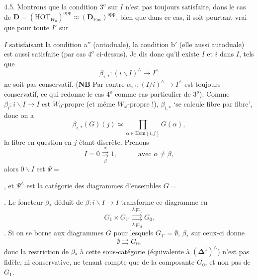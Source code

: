 \documentclass[11pt]{article}
\newcommand{\printedpage}[1]{\marginpar{\footnotesize p.~#1}}
\def\dcprintedpending{}
\newcommand{\msp}[1]{\marginpar{\footnotesize\raggedright
  \ifx\dcprintedpending\empty\else p.~\dcprintedpending\par\fi
  [#1]}\gdef\dcprintedpending{}}
\newcommand{\bD}{\mathbf{D}}
\begin{document}
4.5. Montrons que la condition $3^o$ sur $I$ n'est pas toujours satisfaite, dans le cas de $\bD = (\mathrm{HOT}_{W_0})^{\mathrm{opp}} \approx (\bD_{\mathrm{Ens}})^{\mathrm{opp}}$, bien que dans ce cas, il soit pourtant vrai que pour toute $I'$ sur

\printedpage{39}

$I$ satisfaisant la condition a$''$ (autoduale), la condition b$'$ (elle aussi autoduale) est aussi satisfaite (par cas $4^o$ ci-dessus). Je dis donc qu'il existe $I$ et $i$ dans $I$, tels que
\[
\beta_{i,*} : (i\backslash I)^\wedge \longrightarrow I^\wedge
\]
ne soit pas conservatif. (\textbf{NB} Par contre $\alpha_{i,!} : (I/i)^\wedge \longrightarrow I^\wedge$ est toujours conservatif, ce qui redonne le cas $4^o$ comme cas particulier de $3^o$). Comme $\beta_i : i\backslash I \longrightarrow I$ est $W_0$-propre (et même $W_\omega$-propre !), $\beta_{i,*}$ `se calcule fibre par fibre', donc on a
\msp{page 64}
\[
\beta_{i,*}(G)(j) \simeq \prod_{\alpha\in\mathrm{Hom}(i,j)} G(\alpha),
\]
la fibre en question en $j$ étant discrète. Prenons
\[
I = 0 \underset{\beta}{\overset{\alpha}{\rightrightarrows}} 1, \qquad\quad \text{avec } \alpha \neq \beta,
\]
alors $0\backslash I$ est $\Psi = {}$, et $\Psi^\wedge$ est la catégorie des diagrammes d'ensembles $G = {}$. Le foncteur $\beta_*$ déduit de $\beta : i\backslash I \longrightarrow I$ transforme ce diagramme en
\[
G_1 \times G_{1'} \underset{\lambda\,\mathrm{pr}_2}{\overset{\lambda\,\mathrm{pr}_1}{\rightrightarrows}} G_0.
\]
. Si on se borne aux diagrammes $G$ pour lesquels $G_{1'} = \emptyset$, $\beta_*$ sur ceux-ci donne
\[
\emptyset \rightrightarrows G_0,
\]
donc la restriction de $\beta_*$ à cette sous-catégorie (équivalente à $(\boldsymbol{\Delta}^1)^\wedge$) n'est pas fidèle, ni conservative, ne tenant compte que de la composante $G_0$, et non pas de $G_1$.
\end{document}
